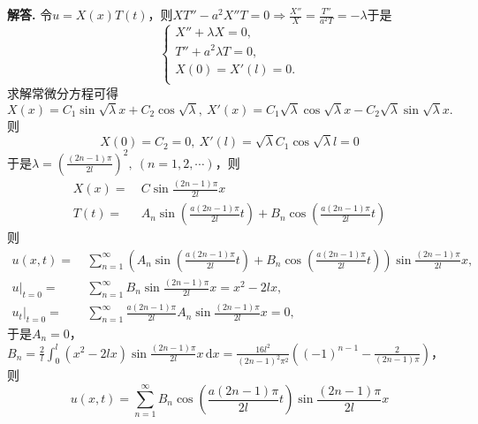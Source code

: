 \documentclass[12pt, a4paper, oneside]{ctexart}
\newenvironment{solution}[1][]{\par\noindent\textbf{#1解答. }}{\smallskip\par}  %
\def\d{\mathrm{d}}          %
\begin{document}
\begin{solution}
    令$u = X(x)T(t)$，则$XT''-a^2X''T = 0\Rightarrow \frac{X''}{X} = \frac{T''}{a^2T}=-\lambda$于是
    \begin{equation*}
        \begin{cases}
            X''+\lambda X = 0,\\
            T''+a^2\lambda T = 0,\\
            X(0) = X'(l) = 0.\\
        \end{cases}
    \end{equation*}
    求解常微分方程可得
    \begin{equation*}
        X(x) = C_1\sin\sqrt{\lambda}x+C_2\cos\sqrt{\lambda},\ X'(x) = C_1\sqrt{\lambda}\cos\sqrt{\lambda}x-C_2\sqrt{\lambda}\sin\sqrt{\lambda}x.
    \end{equation*}
    则
    \begin{equation*}
        X(0) = C_2 = 0,\ X'(l) = \sqrt{\lambda}C_1\cos\sqrt{\lambda}l = 0
    \end{equation*}
    于是$\lambda = \left(\frac{(2n-1)\pi}{2l}\right)^2,\ (n=1,2,\cdots)$，则
    \begin{align*}
        X(x) =&\ C\sin\frac{(2n-1)\pi}{2l}x\\
        T(t) =&\ A_n\sin\left(\frac{a(2n-1)\pi}{2l}t\right)+B_n\cos\left(\frac{a(2n-1)\pi}{2l}t\right)
    \end{align*}
    则
    \begin{align*}
        u(x,t) =&\ \sum_{n=1}^\infty(A_n\sin\left(\frac{a(2n-1)\pi}{2l}t\right)+B_n\cos\left(\frac{a(2n-1)\pi}{2l}t\right))\sin\frac{(2n-1)\pi}{2l}x,\\
        u|_{t=0}=&\ \sum_{n=1}^\infty B_n\sin\frac{(2n-1)\pi}{2l}x = x^2-2lx,\\
        u_t|_{t=0}=&\ \sum_{n=1}^\infty \frac{a(2n-1)\pi}{2l}A_n\sin\frac{(2n-1)\pi}{2l}x = 0,
    \end{align*}
    于是$A_n = 0$，$B_n = \frac{2}{l}\int_0^l(x^2-2lx)\sin\frac{(2n-1)\pi}{2l}x\,\d x = \frac{16l^2}{(2n-1)^2\pi^2}\left((-1)^{n-1}-\frac{2}{(2n-1)\pi}\right)$，则
    \begin{equation*}
        u(x,t) = \sum_{n=1}^\infty B_n\cos\left(\frac{a(2n-1)\pi}{2l}t\right)\sin\frac{(2n-1)\pi}{2l}x
    \end{equation*}
\end{solution}
\end{document}
